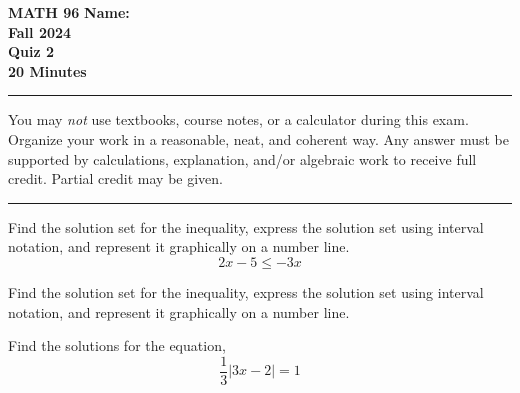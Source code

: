 \documentclass[11pt]{exam}
\begin{document}
\pagestyle{empty}
\textbf{MATH 96}  \textbf{Name:} \makebox[2.77in]{\hrulefill}\\
\textbf{Fall 2024} \\
\textbf{Quiz 2}\\
\textbf{20 Minutes}   

\rule[1ex]{\textwidth}{.1pt}
You may \emph{not} use textbooks, course notes, or a calculator during this exam. Organize your work in a reasonable, neat, and coherent way.  Any answer must be supported by calculations, explanation, and/or algebraic work to receive full credit. Partial credit may be given.
\vspace{5pt}\\
\rule[1ex]{\textwidth}{.1pt}
\noprintanswers
\begin{questions}
\vspace{-10pt}
\question[8] Find the solution set for the inequality, express the solution set using interval notation, and represent it graphically on a number line.
\[2x - 5 \leq -3x\]

\vspace{2in}

\question[12] Find the solution set for the inequality, express the solution set using interval notation, and represent it graphically on a number line.


\question[10] Find the solutions for the equation,
\[\frac{1}{3}\vert 3x-2 \vert = 1\]


\addpoints
\end{questions}
\end{document}
